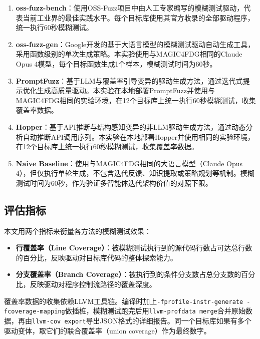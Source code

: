 \begin{enumerate}
\item \textbf{oss-fuzz-bench}：使用OSS-Fuzz项目中由人工专家编写的模糊测试驱动，代表当前工业界的最佳实践水平。每个目标库使用其官方收录的全部驱动程序，统一执行60秒模糊测试。

\item \textbf{oss-fuzz-gen}：Google开发的基于大语言模型的模糊测试驱动自动生成工具\cite{liu2023}，采用函数级别的单次生成策略。本实验使用与MAGIC4FDG相同的Claude Opus 4模型，每个目标函数生成1个样本，模糊测试时间为60秒。

\item \textbf{PromptFuzz}：基于LLM与覆盖率引导变异的驱动生成方法\cite{lyu2024}，通过迭代式提示优化生成高质量驱动。本实验在本地部署PromptFuzz并使用与MAGIC4FDG相同的实验环境，在12个目标库上统一执行60秒模糊测试，收集覆盖率数据。

\item \textbf{Hopper}：基于API推断与结构感知变异的非LLM驱动生成方法\cite{yu2024}，通过动态分析自动推断API调用序列。本实验在本地部署Hopper并使用相同的实验环境，在12个目标库上统一执行60秒模糊测试，收集覆盖率数据。

\item \textbf{Naive Baseline}：使用与MAGIC4FDG相同的大语言模型（Claude Opus 4），但仅执行单轮生成，不包含迭代反馈、知识提取或策略规划等机制。模糊测试时间为60秒，作为验证多智能体迭代架构价值的对照下限。
\end{enumerate}

\subsection{评估指标}

本文用两个指标来衡量各方法的模糊测试效果：

\begin{itemize}
\item \textbf{行覆盖率（Line Coverage）}：被模糊测试执行到的源代码行数占可达总行数的百分比，反映驱动对目标库代码的整体探索能力。

\item \textbf{分支覆盖率（Branch Coverage）}：被执行到的条件分支数占总分支数的百分比，反映驱动对程序控制流路径的覆盖深度。
\end{itemize}

覆盖率数据的收集依赖LLVM工具链。编译时加上\texttt{-fprofile-instr-generate -fcoverage-mapping}做插桩，模糊测试跑完后用\texttt{llvm-profdata merge}合并原始数据，再由\texttt{llvm-cov export}导出JSON格式的详细报告。同一个目标库如果有多个驱动变体，取它们的联合覆盖率（union coverage）作为最终数字。

